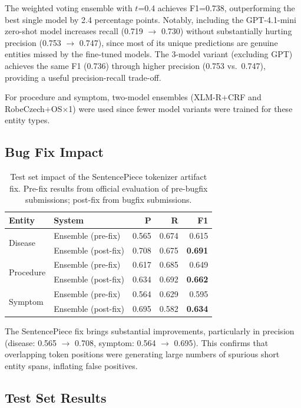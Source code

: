 \documentclass[11pt]{article}
\begin{document}
The weighted voting ensemble with $t$=0.4 achieves F1=0.738, outperforming the best
single model by 2.4 percentage points. Notably, including the GPT-4.1-mini zero-shot
model increases recall (0.719 $\to$ 0.730) without substantially hurting precision (0.753 $\to$ 0.747),
since most of its unique predictions are genuine entities missed by the fine-tuned models.
The 3-model variant (excluding GPT) achieves the same F1 (0.736) through higher precision
(0.753 vs.\ 0.747), providing a useful precision-recall trade-off.

For procedure and symptom, two-model ensembles (XLM-R+CRF and RobeCzech+OS$\times$1)
were used since fewer model variants were trained for these entity types.

\subsection{Bug Fix Impact}

\begin{table}[h]
\centering
\small
\begin{tabular}{llrrr}
\toprule
\textbf{Entity} & \textbf{System} & \textbf{P} & \textbf{R} & \textbf{F1} \\
\midrule
\multirow{2}{*}{Disease}
  & Ensemble (pre-fix) & 0.565 & 0.674 & 0.615 \\
  & Ensemble (post-fix) & 0.708 & 0.675 & \textbf{0.691} \\
\midrule
\multirow{2}{*}{Procedure}
  & Ensemble (pre-fix) & 0.617 & 0.685 & 0.649 \\
  & Ensemble (post-fix) & 0.634 & 0.692 & \textbf{0.662} \\
\midrule
\multirow{2}{*}{Symptom}
  & Ensemble (pre-fix) & 0.564 & 0.629 & 0.595 \\
  & Ensemble (post-fix) & 0.695 & 0.582 & \textbf{0.634} \\
\bottomrule
\end{tabular}
\caption{Test set impact of the SentencePiece tokenizer artifact fix. Pre-fix results from
official evaluation of pre-bugfix submissions; post-fix from bugfix submissions.}
\label{tab:bugfix}
\end{table}

The SentencePiece fix brings substantial improvements, particularly in precision (disease:
0.565 $\to$ 0.708, symptom: 0.564 $\to$ 0.695). This confirms that overlapping token
positions were generating large numbers of spurious short entity spans, inflating false positives.

\subsection{Test Set Results}
\end{document}
